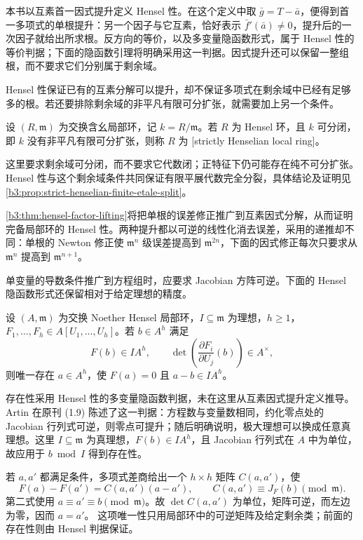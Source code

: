 本书以互素首一因式提升定义 Hensel 性。在这个定义中取 \(\bar g=T-\bar a\)，便得到首一多项式的单根提升：另一个因子与它互素，恰好表示 \(\bar f'(\bar a)\ne0\)，提升后的一次因子就给出所求根。反方向的等价，以及多变量隐函数形式，属于 Hensel 性的等价判据；下面的隐函数引理将明确采用这一判据。因式提升还可以保留一整组根，而不要求它们分别属于剩余域。

\ProseParagraphBreak
Hensel 性保证已有的互素分解可以提升，却不保证多项式在剩余域中已经有足够多的根。若还要排除剩余域的非平凡有限可分扩张，就需要加上另一个条件。

\begin{definition}\label{b3:def:strictly-henselian-local-ring}
	设 \((R,\mathfrak m)\) 为交换含幺局部环，记 \(k=R/\mathfrak m\)。若 \(R\) 为 Hensel 环，且 \(k\) 可分闭，即 \(k\) 没有非平凡有限可分扩张，则称 \(R\) 为 [strictly Henselian local ring]。
\end{definition}

这里要求剩余域可分闭，而不要求它代数闭；正特征下仍可能存在纯不可分扩张。Hensel 性与这个剩余域条件共同保证有限平展代数完全分裂，具体结论及证明见\cref{b3:prop:strict-henselian-finite-etale-split}。

\ProseParagraphBreak
\cref{b3:thm:hensel-factor-lifting}将把单根的误差修正推广到互素因式分解，从而证明完备局部环的 Hensel 性。两种提升都以可逆的线性化消去误差，采用的递推却不同：单根的 Newton 修正使 \(\mathfrak m^n\) 级误差提高到 \(\mathfrak m^{2n}\)，下面的因式修正每次只要求从 \(\mathfrak m^n\) 提高到 \(\mathfrak m^{n+1}\)。

\ProseParagraphBreak
单变量的导数条件推广到方程组时，应要求 Jacobian 方阵可逆。下面的 Hensel 隐函数形式还保留相对于给定理想的精度。

\begin{lemma}\label{b3:lem:henselian-jacobian-lifting}
	设 \((A,\mathfrak m)\) 为交换 Noether Hensel 局部环，\(I\subseteq\mathfrak m\) 为理想，\(h\ge1\)，\(F_1,\ldots,F_h\in A[U_1,\ldots,U_h]\)。若 \(b\in A^h\) 满足
	\[
		F(b)\in IA^h, \qquad \det\left(\frac{\partial F_i}{\partial U_j}(b)\right)\in A^\times,
	\]
	则唯一存在 \(a\in A^h\)，使 \(F(a)=0\) 且 \(a-b\in IA^h\)。
\end{lemma}
\begin{proofsketch}
	存在性采用 Hensel 性的多变量隐函数判据，未在这里从互素因式提升定义推导。Artin 在原刊 (1.9) 陈述了这一判据：方程数与变量数相同，约化零点处的 Jacobian 行列式可逆，则零点可提升；随后明确说明，极大理想可以换成任意真理想\cite[(1.9), pp. 25--26]{Artin1969AlgebraicApproximation}。这里 \(I\subseteq\mathfrak m\) 为真理想，\(F(b)\in IA^h\)，且 Jacobian 行列式在 \(A\) 中为单位，故应用于 \(b\bmod I\) 得到存在性。

	若 \(a,a'\) 都满足条件，多项式差商给出一个 \(h\times h\) 矩阵 \(C(a,a')\)，使
	\[
		F(a)-F(a')=C(a,a')(a-a'), \qquad C(a,a')\equiv J_F(b)\pmod{\mathfrak m}.
	\]
	第二式使用 \(a\equiv a'\equiv b\pmod{\mathfrak m}\)。故 \(\det C(a,a')\) 为单位，矩阵可逆，而左边为零，因而 \(a=a'\)。 这项唯一性只用局部环中的可逆矩阵及给定剩余类；前面的存在性则由 Hensel 判据保证。
\end{proofsketch}

